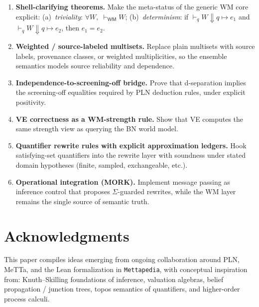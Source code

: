 \documentclass[]{article}
\newcommand{\code}[1]{\texttt{#1}}
\newcommand{\WM}{\mathsf{WM}}
\begin{document}
\begin{enumerate}[leftmargin=2em]
\item \textbf{Shell-clarifying theorems.}
Make the meta-status of the generic WM core explicit:
(a)~\emph{triviality}: $\forall W,\; \vdash_{\WM} W$;
(b)~\emph{determinism}: if $\vdash_q W \Downarrow q \mapsto e_1$ and
$\vdash_q W \Downarrow q \mapsto e_2$, then $e_1 = e_2$.
\item \textbf{Weighted / source-labeled multisets.}
Replace plain multisets with source labels, provenance classes, or
weighted multiplicities, so the ensemble semantics models source
reliability and dependence.
\item \textbf{Independence-to-screening-off bridge.}
Prove that d-separation implies the screening-off equalities required by
PLN deduction rules, under explicit positivity.
\item \textbf{VE correctness as a WM-strength rule.}
Show that VE computes the same strength view as querying the BN world
model.
\item \textbf{Quantifier rewrite rules with explicit approximation
  ledgers.}
Hook satisfying-set quantifiers into the rewrite layer with soundness
under stated domain hypotheses (finite, sampled, exchangeable, etc.).
\item \textbf{Operational integration (MORK).}
Implement message passing as inference control that proposes
$\Sigma$-guarded rewrites, while the WM layer remains the single source
of semantic truth.
\end{enumerate}


\section*{Acknowledgments}

This paper compiles ideas emerging from ongoing collaboration around PLN,
MeTTa, and the Lean formalization in \code{Mettapedia}, with conceptual
inspiration from: Knuth--Skilling foundations of inference, valuation
algebras, belief propagation / junction trees, topos semantics of
quantifiers, and higher-order process calculi.



\end{document}
